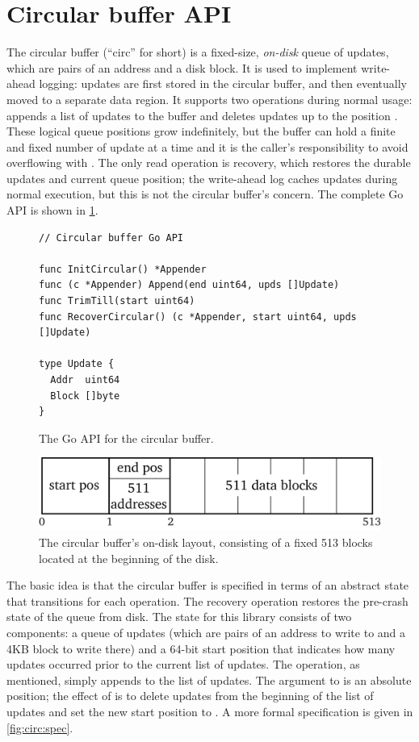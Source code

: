 \section{Circular buffer API}
\label{sec:circ-api}

The circular buffer (``circ'' for short) is a fixed-size, \emph{on-disk} queue of
updates, which are pairs of an address and a disk block. It is used to implement
write-ahead logging: updates are first stored in the circular buffer, and
then eventually moved to a separate data region. It supports two operations
during normal usage:  appends a list of updates to the buffer
and  deletes updates up to the position . These logical queue positions grow
indefinitely, but the buffer can hold a finite and fixed number of update at a time and it
is the caller's responsibility to avoid overflowing with . The only
read operation is recovery, which restores the durable updates and current queue
position; the write-ahead log caches updates during normal execution, but this
is not the circular buffer's concern. The complete Go API is shown in
\cref{fig:circ:api}.

\begin{figure}[ht]
\begin{verbatim}
// Circular buffer Go API

func InitCircular() *Appender
func (c *Appender) Append(end uint64, upds []Update)
func TrimTill(start uint64)
func RecoverCircular() (c *Appender, start uint64, upds []Update)

type Update {
  Addr  uint64
  Block []byte
}
\end{verbatim}
  \caption{The Go API for the circular buffer.}%
  \label{fig:circ:api}
\end{figure}

\begin{figure}[ht]
  \includegraphics{fig/circ-phys.png}
\caption{The circular buffer's on-disk layout, consisting of a fixed 513 blocks
  located at the beginning of the disk.}
\label{fig:circ:phys}
\end{figure}

The basic idea is that the circular buffer is specified in terms of an abstract
state that transitions for each operation. The recovery operation
restores the pre-crash state of the queue from disk. The state for this library consists
of two components: a queue of updates (which are pairs of an address to write to
and a 4KB block to write there) and a 64-bit start position that indicates how
many updates occurred prior to the current list of updates. The  operation, as
mentioned, simply appends to the list of updates. The argument to 
is an absolute position; the effect of  is to delete
 updates from the beginning of the list of updates and set the
new start position to . A more formal specification is given in
\cref{fig:circ:spec}.

